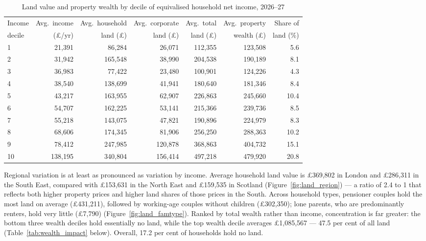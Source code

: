 \begin{table}[htbp]
\centering
\caption{Land value and property wealth by decile of equivalised household net income, 2026--27}
\label{tab:land_income}
\footnotesize
\setlength{\tabcolsep}{4pt}
\begin{tabular}{lrrrrrr}
\toprule
Income & Avg.\ income & Avg.\ household & Avg.\ corporate & Avg.\ total & Avg.\ property & Share of \\
decile & (\pounds/yr) & land (\pounds) & land (\pounds) & land (\pounds) & wealth (\pounds) & land (\%) \\
\midrule
1  & 21{,}391  & 86{,}284  & 26{,}071  & 112{,}355 & 123{,}508 & 5.6 \\
2  & 31{,}942  & 165{,}548 & 38{,}990  & 204{,}538 & 190{,}189 & 8.1 \\
3  & 36{,}983  & 77{,}422  & 23{,}480  & 100{,}901 & 124{,}226 & 4.3 \\
4  & 38{,}540  & 138{,}699 & 41{,}941  & 180{,}640 & 181{,}346 & 8.4 \\
5  & 43{,}217  & 163{,}955 & 62{,}907  & 226{,}863 & 245{,}660 & 10.4 \\
6  & 54{,}707  & 162{,}225 & 53{,}141  & 215{,}366 & 239{,}736 & 8.5 \\
7  & 55{,}218  & 143{,}075 & 47{,}821  & 190{,}896 & 224{,}979 & 8.3 \\
8  & 68{,}606  & 174{,}345 & 81{,}906  & 256{,}250 & 288{,}363 & 10.2 \\
9  & 78{,}412  & 247{,}985 & 120{,}878 & 368{,}863 & 404{,}732 & 15.1 \\
10 & 138{,}195 & 340{,}804 & 156{,}414 & 497{,}218 & 479{,}920 & 20.8 \\
\bottomrule
\end{tabular}

\end{table}

Regional variation is at least as pronounced as variation by income. Average household land value is \pounds 369{,}802 in London and \pounds 286{,}311 in the South East, compared with \pounds 153{,}631 in the North East and \pounds 159{,}535 in Scotland (Figure~\ref{fig:land_region}) --- a ratio of 2.4 to 1 that reflects both higher property prices and higher land shares of those prices in the South. Across household types, pensioner couples hold the most land on average (\pounds 431{,}211), followed by working-age couples without children (\pounds 302{,}350); lone parents, who are predominantly renters, hold very little (\pounds 7{,}790) (Figure~\ref{fig:land_famtype}). Ranked by total wealth rather than income, concentration is far greater: the bottom three wealth deciles hold essentially no land, while the top wealth decile averages \pounds 1{,}085{,}567 --- 47.5 per cent of all land (Table~\ref{tab:wealth_impact} below). Overall, 17.2 per cent of households hold no land.

